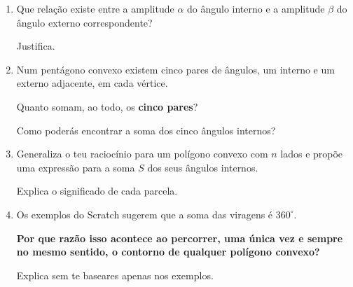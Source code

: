 \begin{center}


\end{center}

\begin{enumerate}[label=\textbf{4.\arabic*.}]

\item
Que relação existe entre a
amplitude $\alpha$ do ângulo interno
e a amplitude $\beta$ do ângulo
externo correspondente?

Justifica.


\item
Num pentágono convexo existem
cinco pares de ângulos,
um interno e um externo adjacente,
em cada vértice.

Quanto somam, ao todo,
os \textbf{cinco pares}?

Como poderás encontrar a soma
dos cinco ângulos internos?


\item
Generaliza o teu raciocínio
para um polígono convexo com
$n$ lados e propõe uma expressão
para a soma $S$ dos seus
ângulos internos.

Explica o significado
de cada parcela.

\newpage
\item
Os exemplos do Scratch sugerem
que a soma das viragens é $360^\circ$.

\textbf{Por que razão isso acontece
ao percorrer, uma única vez e sempre
no mesmo sentido, o contorno de
qualquer polígono convexo?}

Explica sem te baseares
apenas nos exemplos.


\end{enumerate}

